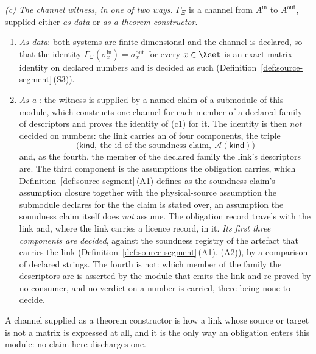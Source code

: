 \begin{definition}
\emph{(c) The channel witness, in one of two ways.} $\Gamma_{\Xi}$ is a
channel from $A^{\mathrm{in}}$ to $A^{\mathrm{out}}$, supplied either
\emph{as data} or \emph{as a theorem constructor}.
\begin{enumerate}[label=(c\arabic*),leftmargin=2.6em]
\item \emph{As data}: both systems are finite dimensional and the channel is
declared, so that the identity
$\Gamma_{\Xi}(\sigma^{\mathrm{in}}_x)=\sigma^{\mathrm{out}}_x$ for every
$x\in\Xset$ is an exact matrix identity on declared numbers and is decided as
such (Definition~\ref{def:source-segment}\,(S3)).
\item \emph{As a} : the witness is supplied by a
named claim of a submodule of this module, which constructs one channel for
each member of a declared family of descriptors and proves the identity of
(c1) for it. The identity is then \emph{not} decided on numbers: the link
carries an  of four components, the triple
\begin{equation}\label{eq:obligation}
  \big(\textsf{kind},\ \text{the id of the soundness claim},\
  \mathcal{A}(\textsf{kind})\big)
\end{equation}
and, as the fourth, the member of the declared family the link's descriptors
are. The third component is the assumptions the obligation carries, which
Definition~\ref{def:source-segment}\,(A1) defines as the soundness claim's
assumption closure together with the physical-source assumption the
submodule declares for the \tref{source model} the claim is stated over, an
assumption the soundness claim itself does \emph{not} assume. The obligation
record travels with the link and, where the link carries a licence record, in
it. \emph{Its first three components are decided}, against the soundness
registry of the artefact that carries the link
(Definition~\ref{def:source-segment}\,(A1), (A2)), by a comparison of
declared strings. The fourth is not: which member of the family the
descriptors are is asserted by the module that emits the link and re-proved
by no consumer, and no verdict on a number is carried, there being none to
decide.
\end{enumerate}
A channel supplied as a theorem constructor is how a link whose source or
target is not a matrix is expressed at all, and it is the only way an
obligation enters this module: no claim here discharges one.


\end{definition}
